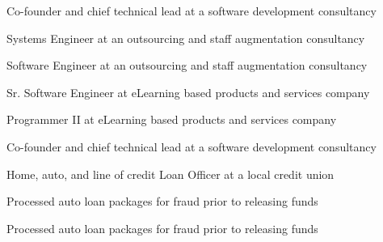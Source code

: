 
Co-founder and chief technical lead at a software development consultancy

\newpage

\divider

Systems Engineer at an outsourcing and staff augmentation consultancy

\divider

Software Engineer at an outsourcing and staff augmentation consultancy

\divider

Sr. Software Engineer at eLearning based products and services company

\divider

Programmer II at eLearning based products and services company

\divider

Co-founder and chief technical lead at a software development consultancy

\divider

Home, auto, and line of credit Loan Officer at a local credit union

\divider

Processed auto loan packages for fraud prior to releasing funds

\divider

Processed auto loan packages for fraud prior to releasing funds

\bigskip